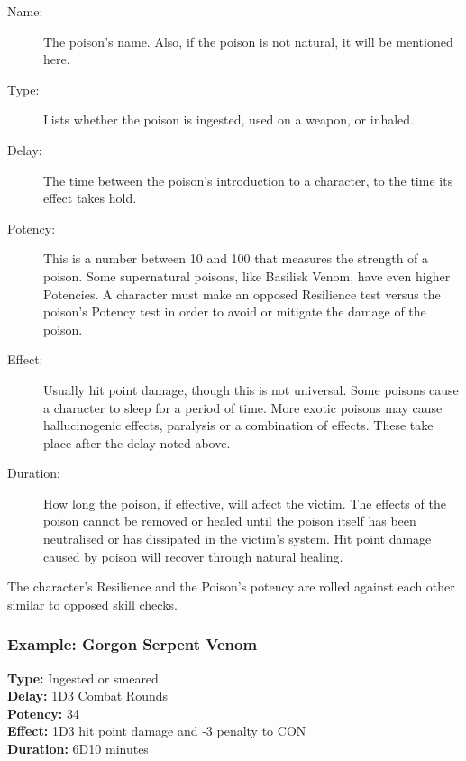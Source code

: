 \begin{description}
	\item[Name:] The poison’s name. Also, if the poison is not natural, it will be mentioned here. 
	\item[Type:] Lists whether the poison is ingested, used on a weapon, or inhaled. 
	\item[Delay:] The time between the poison’s introduction to a character, to the time its effect takes hold. 
	\item[Potency:] This is a number between 10 and 100 that measures the strength of a poison. Some supernatural poisons, like Basilisk Venom, have even higher Potencies. A character must make an opposed Resilience test versus the poison’s Potency test in order to avoid or mitigate the damage of the poison. 
	\item[Effect:] Usually hit point damage, though this is not universal. Some poisons cause a character to sleep for a period of time. More exotic poisons may cause hallucinogenic effects, paralysis or a combination of effects. These take place after the delay noted above. 
	\item[Duration:] How long the poison, if effective, will affect the victim. The effects of the poison cannot be removed or healed until the poison itself has been neutralised or has dissipated in the victim’s system. Hit point damage caused by poison will recover through natural healing. 
\end{description}

The character's Resilience and the Poison's potency are rolled against each other similar to opposed skill checks.

\subsubsection{Example: Gorgon Serpent Venom}

\noindent\textbf{Type:} Ingested or smeared\\
\noindent\textbf{Delay:} 1D3 Combat Rounds\\
\noindent\textbf{Potency:} 34\\
\noindent\textbf{Effect:} 1D3 hit point damage and -3 penalty to CON\\
\noindent\textbf{Duration:} 6D10 minutes\\


